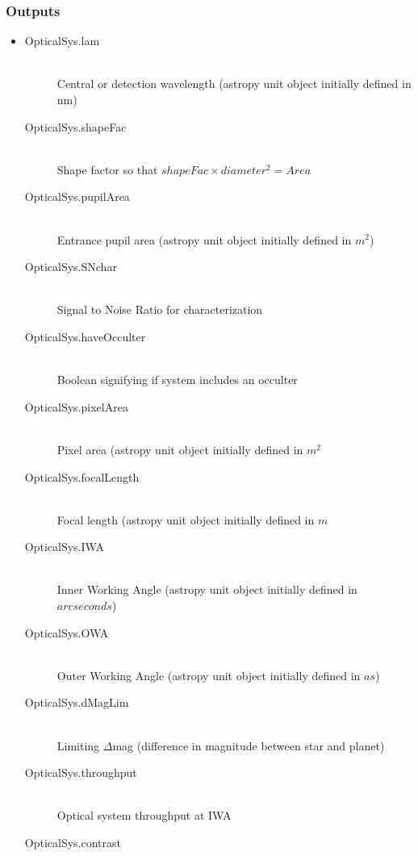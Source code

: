 \documentclass[cleanfoot]{asme2ej}
\begin{document}
\subsubsection*{Outputs}
\begin{itemize}
    \item 
    \begin{description}
        \item[OpticalSys.lam] \hfill \\
        Central or detection wavelength (astropy unit object initially defined in nm)
        \item[OpticalSys.shapeFac] \hfill \\
        Shape factor so that $ shapeFac \times diameter^2 = Area $
        \item[OpticalSys.pupilArea] \hfill \\
        Entrance pupil area (astropy unit object initially defined in $ m^{2} $)
        \item[OpticalSys.SNchar] \hfill \\
        Signal to Noise Ratio for characterization
        \item[OpticalSys.haveOcculter] \hfill \\
        Boolean signifying if system includes an occulter
        \item[OpticalSys.pixelArea] \hfill \\
        Pixel area (astropy unit object initially defined in $ m^{2} $
        \item[OpticalSys.focalLength] \hfill \\
        Focal length (astropy unit object initially defined in $ m $
        \item[OpticalSys.IWA] \hfill \\
        Inner Working Angle (astropy unit object initially defined in $ arcseconds $)
        \item[OpticalSys.OWA] \hfill \\
        Outer Working Angle (astropy unit object initially defined in $ as $)
        \item[OpticalSys.dMagLim] \hfill \\
        Limiting $ \Delta$mag (difference in magnitude between star and planet)
        \item[OpticalSys.throughput] \hfill \\
        Optical system throughput at IWA
        \item[OpticalSys.contrast] \hfill \\

\end{description}
\end{itemize}
\end{document}
